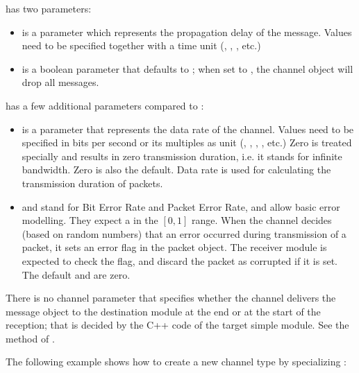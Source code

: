  has two parameters:

\begin{itemize}
    \item {} is a  parameter which represents the
          propagation delay of the message. Values need to be specified
          together with a time unit (, , , etc.)
    \item {} is a boolean parameter that defaults to ;
          when set to , the channel object will drop all messages.
\end{itemize}

 has a few additional parameters compared to :

\begin{itemize}
    \item {} is a  parameter that represents the
          data rate of the channel. Values need to be specified
          in bits per second or its multiples as unit (,
          , , , etc.) Zero is treated
          specially and results in zero transmission duration, i.e.
          it stands for infinite bandwidth. Zero is also the default.
          Data rate is used for calculating the transmission duration of
          packets.
    \item {} and  stand for Bit Error Rate and Packet Error Rate,
          and allow basic error modelling. They expect a 
          in the $[0,1]$ range. When the channel decides (based on random
          numbers) that an error occurred during transmission of a packet,
          it sets an error flag in the packet object. The receiver
          module is expected to check the flag, and discard the packet
          as corrupted if it is set. The default  and 
          are zero.
\end{itemize}

\begin{note}
    There is no channel parameter that specifies whether the channel
    delivers the message object to the destination module at the end or
    at the start of the reception; that is decided by the C++ code
    of the target simple module. See the 
    method of .
\end{note}

The following example shows how to create a new channel type by
specializing :

